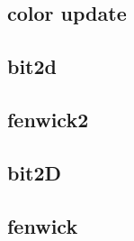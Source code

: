 \subsection{color update}
\raggedbottom
\hrulefill
\subsection{bit2d}
\raggedbottom
\hrulefill
\subsection{fenwick2}
\raggedbottom
\hrulefill
\subsection{bit2D}
\raggedbottom
\hrulefill
\subsection{fenwick}
\raggedbottom
\hrulefill

